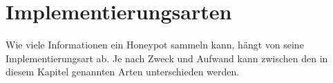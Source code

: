 \chapter{Implementierungsarten}
Wie viele Informationen ein Honeypot sammeln kann, hängt von seine Implementierungsart ab. Je nach Zweck und Aufwand kann zwischen den in diesem Kapitel genannten Arten unterschieden werden.





